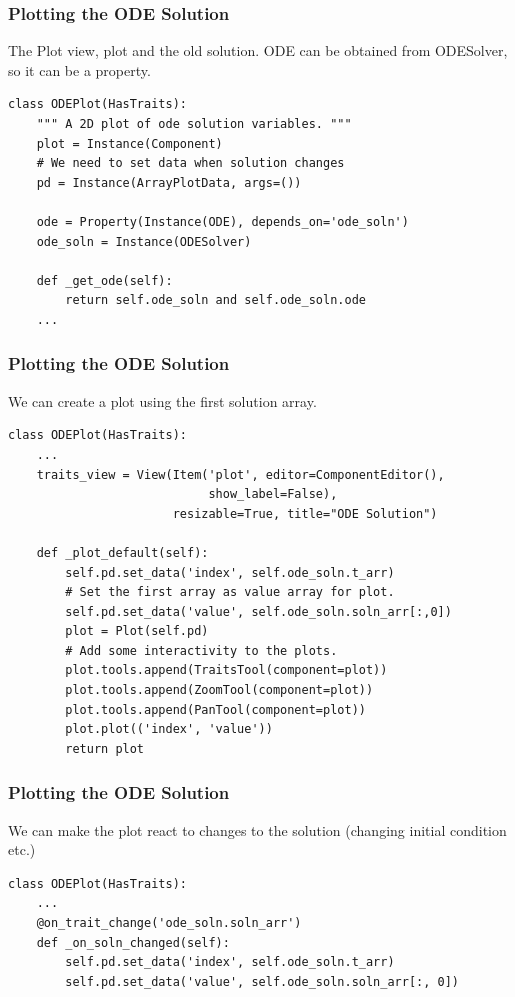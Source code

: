 \documentclass[14pt,compress]{beamer}
\begin{document}
\begin{frame}
\frametitle{Plotting the ODE Solution}
\scriptsize
The Plot view, plot and the old solution. ODE can be obtained from ODESolver,
so it can be a property.
\begin{lstlisting}
class ODEPlot(HasTraits):
    """ A 2D plot of ode solution variables. """
    plot = Instance(Component)
    # We need to set data when solution changes
    pd = Instance(ArrayPlotData, args=())

    ode = Property(Instance(ODE), depends_on='ode_soln')
    ode_soln = Instance(ODESolver)

    def _get_ode(self):
        return self.ode_soln and self.ode_soln.ode
    ...
\end{lstlisting}
\end{frame}

\begin{frame}
\frametitle{Plotting the ODE Solution}
\scriptsize
We can create a plot using the first solution array.
\begin{lstlisting}
class ODEPlot(HasTraits):
    ...
    traits_view = View(Item('plot', editor=ComponentEditor(),
                            show_label=False),
                       resizable=True, title="ODE Solution")

    def _plot_default(self):
        self.pd.set_data('index', self.ode_soln.t_arr)
        # Set the first array as value array for plot.
        self.pd.set_data('value', self.ode_soln.soln_arr[:,0])
        plot = Plot(self.pd)
        # Add some interactivity to the plots.
        plot.tools.append(TraitsTool(component=plot))
        plot.tools.append(ZoomTool(component=plot))
        plot.tools.append(PanTool(component=plot))
        plot.plot(('index', 'value'))
        return plot
\end{lstlisting}
\end{frame}

\begin{frame}
\frametitle{Plotting the ODE Solution}
\scriptsize
We can make the plot react to changes to the solution
(changing initial condition etc.)
\begin{lstlisting}
class ODEPlot(HasTraits):
    ...
    @on_trait_change('ode_soln.soln_arr')
    def _on_soln_changed(self):
        self.pd.set_data('index', self.ode_soln.t_arr)
        self.pd.set_data('value', self.ode_soln.soln_arr[:, 0])
\end{lstlisting}
\end{frame}
\end{document}

